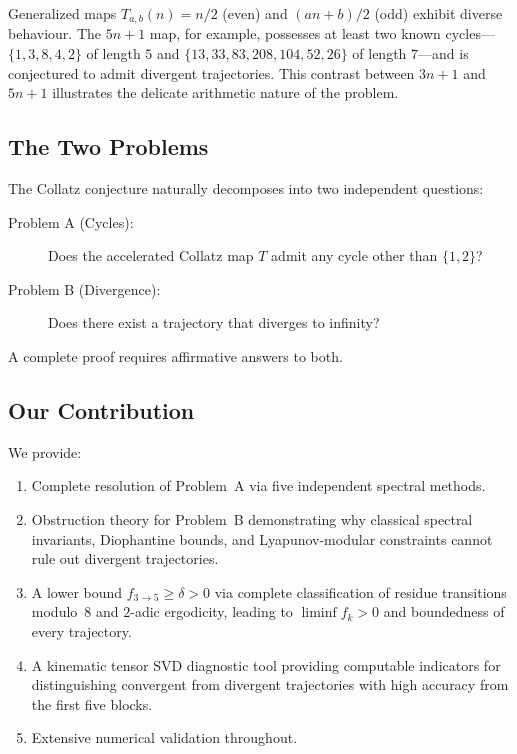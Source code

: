 \documentclass[12pt,a4paper]{article}
\theoremstyle{definition}
\theoremstyle{remark}
\let\oldliminf\liminf
\renewcommand{\liminf}{\oldliminf\limits}
\begin{document}
Generalized maps $T_{a,b}(n)=n/2$ (even) and $(an+b)/2$ (odd) exhibit
diverse behaviour.
The $5n+1$ map, for example, possesses at least two known
cycles---$\{1,3,8,4,2\}$ of length $5$ and $\{13,33,83,208,104,52,26\}$
of length $7$---and is conjectured to admit divergent trajectories.
This contrast between $3n+1$ and $5n+1$ illustrates the delicate
arithmetic nature of the problem.

\subsection{The Two Problems}

The Collatz conjecture naturally decomposes into two independent
questions:
\begin{description}
\item[Problem A (Cycles):] Does the accelerated Collatz map $T$ admit
any cycle other than $\{1,2\}$?
\item[Problem B (Divergence):] Does there exist a trajectory that
diverges to infinity?
\end{description}
A complete proof requires affirmative answers to both.

\subsection{Our Contribution}

We provide:
\begin{enumerate}
\item Complete resolution of Problem~A via five independent spectral
      methods.
\item Obstruction theory for Problem~B demonstrating why classical
      spectral invariants, Diophantine bounds, and Lyapunov-modular
      constraints cannot rule out divergent trajectories.
\item A lower bound $f_{3\to5}\ge\delta>0$ via complete classification
      of residue transitions modulo~$8$ and $2$-adic ergodicity,
      leading to $\liminf f_k>0$ and boundedness of every trajectory.
\item A kinematic tensor SVD diagnostic tool providing computable
      indicators for distinguishing convergent from divergent
      trajectories with high accuracy from the first five blocks.
\item Extensive numerical validation throughout.
\end{enumerate}

\end{document}
